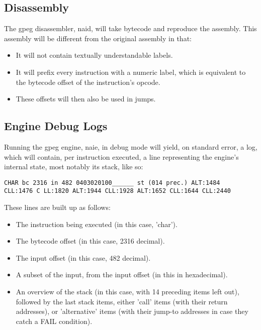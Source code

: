 \subsection{Disassembly}

The gpeg disassembler, naid, will take bytecode and reproduce the
assembly. This assembly will be different from the original assembly
in that:

\begin{itemize}
\item It will not contain textually understandable labels.
\item It will prefix every instruction with a numeric label, which is
      equivalent to the bytecode offset of the instruction's opcode.
\item These offsets will then also be used in jumps.
\end{itemize}

\subsection{Engine Debug Logs}

Running the gpeg engine, naie, in debug mode will yield, on standard error,
a log, which will contain, per instruction executed, a line representing
the engine's internal state, most notably its stack, like so:

\begin{myquote}
\begin{verbatim}
CHAR bc 2316 in 482 0403020100______ st (014 prec.) ALT:1484
CLL:1476 C LL:1820 ALT:1944 CLL:1928 ALT:1652 CLL:1644 CLL:2440
\end{verbatim}
\end{myquote}

These lines are built up as follows:

\begin{itemize}
\item The instruction being executed (in this case, 'char').
\item The bytecode offset (in this case, 2316 decimal).
\item The input offset (in this case, 482 decimal).
\item A subset of the input, from the input offset (in this in hexadecimal).
\item An overview of the stack (in this case, with 14 preceding items left
      out), followed by the last stack items, either 'call' items
      (with their return addresses), or 'alternative' items
      (with their jump-to addresses in case they catch a FAIL condition).
\end{itemize}

